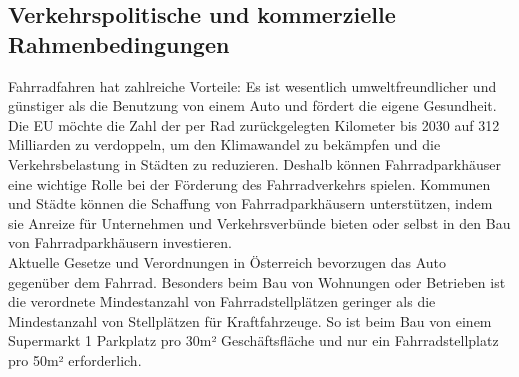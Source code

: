 \subsection{Verkehrspolitische und kommerzielle Rahmenbedingungen}

Fahrradfahren hat zahlreiche Vorteile: Es ist wesentlich umweltfreundlicher und günstiger als die Benutzung von einem Auto und fördert die eigene Gesundheit. Die EU möchte die Zahl der per Rad zurückgelegten Kilometer bis 2030 auf 312 Milliarden zu verdoppeln, um den Klimawandel zu bekämpfen und die Verkehrsbelastung in Städten zu reduzieren.\cite{ludecke_eu_nodate} Deshalb können Fahrradparkhäuser eine wichtige Rolle bei der Förderung des Fahrradverkehrs spielen. Kommunen und Städte können die Schaffung von Fahrradparkhäusern unterstützen, indem sie Anreize für Unternehmen und Verkehrsverbünde bieten oder selbst in den Bau von Fahrradparkhäusern investieren.\\
Aktuelle Gesetze und Verordnungen in Österreich bevorzugen das Auto gegenüber dem Fahrrad. Besonders beim Bau von Wohnungen oder Betrieben ist die verordnete Mindestanzahl von Fahrradstellplätzen geringer als die Mindestanzahl von Stellplätzen für Kraftfahrzeuge.\cite{leitfaden_vorarlberg} So ist beim Bau von einem Supermarkt 1 Parkplatz pro 30m² Geschäftsfläche und nur ein Fahrradstellplatz pro 50m² erforderlich.\cite*{noauthor_ris_nodate} \\ 

